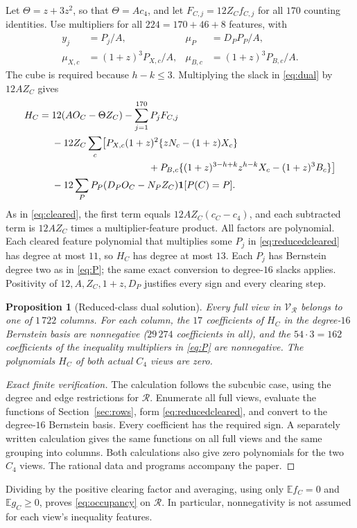\documentclass[11pt]{article}
\newtheorem{proposition}[theorem]{Proposition}
\newcommand{\E}{\mathbb E}\newcommand{\Prob}{\mathbb P}
\newcommand{\ind}{\mathbf1}\newcommand{\F}{\mathcal F}\newcommand{\V}{\mathcal V}
\begin{document}
Let $\Theta=z+3z^2$, so that $\Theta=Ac_4$, and let $F_{C,j}=12Z_Cf_{C,j}$ for all $170$ counting identities. Use multipliers for all $224=170+46+8$ features, with
\begin{align*}
 y_j&=P_j/A,&\mu_P&=D_PP_P/A,\\
 \mu_{X,c}&=(1+z)^3P_{X,c}/A,&\mu_{B,c}&=(1+z)^3P_{B,c}/A.
\end{align*} The cube is required because $h-k\le3$. Multiplying the slack in \eqref{eq:dual} by $12AZ_C$ gives
\begin{align}
 H_C={}&12(AO_C-\Theta Z_C)-\sum_{j=1}^{170}P_jF_{C,j}\notag\\
 &-12Z_C\sum_c\bigl[P_{X,c}(1+z)^2\{zN_c-(1+z)X_c\}\notag\\
 &\hspace{35mm}+P_{B,c}\{(1+z)^{3-h+k}z^{h-k}X_c-(1+z)^3B_c\}\bigr]\notag\\
 &-12\sum_P P_P(D_PO_C-N_PZ_C)\ind[P(C)=P].\label{eq:reducedcleared}
\end{align}
As in \eqref{eq:cleared}, the first term equals $12AZ_C(c_C-c_4)$, and each subtracted term is $12AZ_C$ times a multiplier-feature product. All factors are polynomial. Each cleared feature polynomial that multiplies some $P_j$ in \eqref{eq:reducedcleared} has degree at most $11$, so $H_C$ has degree at most $13$. Each $P_j$ has Bernstein degree two as in \eqref{eq:P}; the same exact conversion to degree-$16$ slacks applies. Positivity of $12,A,Z_C,1+z,D_P$ justifies every sign and every clearing step.

\begin{proposition}[Reduced-class dual solution]\label{prop:reducedcert}
Every full view in $\V_{\mathcal R}$ belongs to one of $1\,722$ columns. For each column, the $17$ coefficients of $H_C$ in the degree-$16$ Bernstein basis are nonnegative ($29\,274$ coefficients in all), and the $54\cdot3=162$ coefficients of the inequality multipliers in \eqref{eq:P} are nonnegative. The polynomials $H_C$ of both actual $C_4$ views are zero.
\end{proposition}
\begin{proof}[Exact finite verification]
The calculation follows the subcubic case, using the degree and edge restrictions for $\mathcal R$. Enumerate all full views, evaluate the functions of Section~\ref{sec:rows}, form \eqref{eq:reducedcleared}, and convert to the degree-$16$ Bernstein basis. Every coefficient has the required sign. A separately written calculation gives the same functions on all full views and the same grouping into columns. Both calculations also give zero polynomials for the two $C_4$ views. The rational data and programs accompany the paper.
\end{proof}
Dividing by the positive clearing factor and averaging, using only $\E f_C=0$ and $\E g_C\ge0$, proves \eqref{eq:occupancy} on $\mathcal R$. In particular, nonnegativity is not assumed for each view's inequality features.
\end{document}
